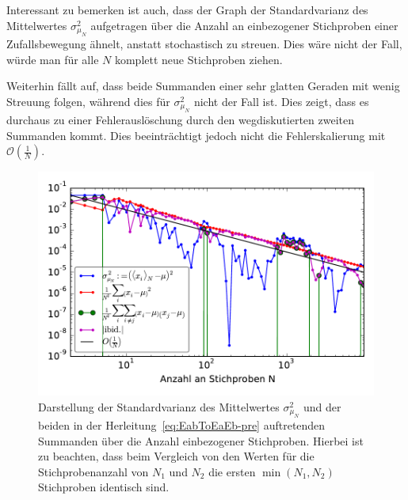 Interessant zu bemerken ist auch, dass der Graph der Standardvarianz des Mittelwertes $\sigma_{\mu_N}^2$ aufgetragen über die Anzahl an einbezogener Stichproben einer Zufallsbewegung ähnelt, anstatt stochastisch zu streuen. Dies wäre nicht der Fall, würde man für alle $N$ komplett neue Stichproben ziehen.

Weiterhin fällt auf, dass beide Summanden einer sehr glatten Geraden mit wenig Streuung folgen, während dies für $\sigma_{\mu_N}^2$ nicht der Fall ist. Dies zeigt, dass es durchaus zu einer Fehlerauslöschung durch den wegdiskutierten zweiten Summanden kommt. Dies beeinträchtigt jedoch nicht die Fehlerskalierung mit $\mathcal{O}\left( \frac{1}{N} \right)$.

\begin{figure}[H]
	\centering
	\begin{minipage}{0.7\linewidth}
		\includegraphics[width=\linewidth]{meanerror.pdf}
	\end{minipage}
	\caption{Darstellung der Standardvarianz des Mittelwertes $\sigma_{\mu_N}^2$ und der beiden in der Herleitung~\ref{eq:EabToEaEb-pre} auftretenden Summanden über die Anzahl einbezogener Stichproben. Hierbei ist zu beachten, dass beim Vergleich von den Werten für die Stichprobenanzahl von $N_1$ und $N_2$ die ersten $\min\left( N_1,N_2 \right)$ Stichproben identisch sind.}
	\label{fig:meanerrorsummand}
\end{figure}
